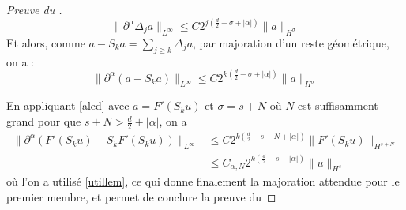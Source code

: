 \documentclass[11pt,a4paper]{article}
\begin{document}
\begin{proof}[Preuve du ]
\begin{equation*}
\|\partial^\alpha \Delta_j a\|_{L^\infty} \leq C 2^{j(\frac{d}{2}-\sigma+|\alpha|)} \|a\|_{H^\sigma}
\end{equation*}
Et alors, comme $a-S_ka=\sum_{j\geq k} \Delta_j a$, par majoration d'un reste géométrique, on a :
\begin{equation}\label{aled}
\|\partial^\alpha (a-S_k a)\|_{L^\infty} \leq C 2^{k(\frac{d}{2}-\sigma+|\alpha|)} \|a\|_{H^\sigma}
\end{equation}

En appliquant \eqref{aled} avec $a=F'(S_ku)$ et $\sigma = s + N$ où $N$ est suffisamment grand pour que $s+N > \frac{d}{2} + |\alpha|$, on a 
\begin{align*}
\|\partial^\alpha (F'(S_ku)-S_k F'(S_ku))\|_{L^\infty} &\leq C 2^{k(\frac{d}{2}-s-N+|\alpha|)} \|F'(S_ku)\|_{H^{s+N}} \\
& \leq  C_{\alpha,N} 2^{k(\frac{d}{2}-s+|\alpha|)} \|u\|_{H^s}
\end{align*}
où l'on a utilisé \eqref{utillem}, ce qui donne finalement la majoration attendue pour le premier membre, et permet de conclure la preuve du 
\end{proof}

















































\newpage
\printbibliography[heading=bibintoc, title={Références}]
\end{document}
